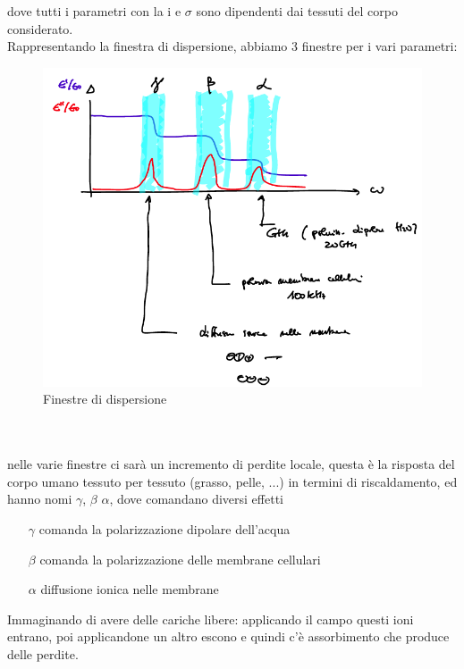 \documentclass[oneside, 12pt]{extbook}
\begin{document}
dove tutti i parametri con la i e $\sigma$ sono dipendenti dai tessuti del corpo considerato.\\Rappresentando la finestra di dispersione, abbiamo 3 finestre per i vari parametri:
\begin{figure}[!h]
	\includegraphics[scale=0.5]{immagini/fin_disp.png}
	\caption{Finestre di dispersione}
\end{figure}
\\\\nelle varie finestre ci sarà un incremento di perdite locale, questa è la risposta del corpo umano tessuto per tessuto (grasso, pelle, ...) in termini di riscaldamento, ed hanno nomi $\gamma$, $\beta$ $\alpha$, dove comandano diversi effetti
\begin{itemize}
	\item[$\gamma$] comanda la polarizzazione dipolare dell'acqua
	\item[$\beta$] comanda la polarizzazione delle membrane cellulari
	\item[$\alpha$] diffusione ionica nelle membrane
\end{itemize}
Immaginando di avere delle cariche libere: applicando il campo questi ioni entrano, poi applicandone un altro escono e quindi c'è assorbimento che produce delle perdite.
\end{document}
